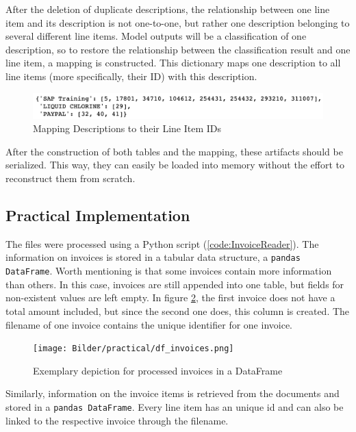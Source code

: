 	After the deletion of duplicate descriptions, the relationship between one line item and its description is not one-to-one, but rather one description belonging to several different line items. Model outputs will be a classification of one description, so to restore the relationship between the classification result and one line item, a mapping is constructed.
	This dictionary maps one description to all line items (more specifically, their ID) with this description.
	\begin{figure}[ht]
		\centering
		\includegraphics[width=\linewidth]{Bilder/description_map.png}
		\caption{Mapping Descriptions to their Line Item IDs}
		\label{fig:mapping}
	\end{figure}


	After the construction of both tables and the mapping, these artifacts should be serialized. This way, they can easily be loaded into memory without the effort to reconstruct them from scratch.
	
    \subsection{Practical Implementation}
	
	The files were processed using a Python script (\ref{code:InvoiceReader}). The information on invoices is stored in a tabular data structure, a \lstinline|pandas DataFrame|. Worth mentioning is that some invoices contain more information than others. In this case, invoices are still appended into one table, but fields for non-existent values are left empty. In figure \ref{fig:df-invoices}, the first invoice does not have a total amount included, but since the second one does, this column is created.
	The filename of one invoice contains the unique identifier for one invoice.
	
	\begin{figure}[ht]
		\centering
		\texttt{[image: Bilder/practical/df\_invoices.png]}
		\caption{Exemplary depiction for processed invoices in a DataFrame}
		\label{fig:df-invoices}
	\end{figure}

	Similarly, information on the invoice items is retrieved from the documents and stored in a \lstinline|pandas DataFrame|. Every line item has an unique id and can also be linked to the respective invoice through the filename.
	
